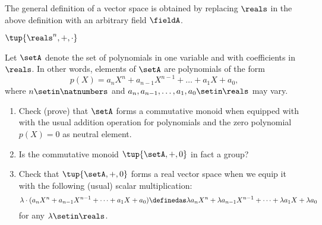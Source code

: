 \begin{remark}
    The general definition of a vector space is obtained by replacing $\reals$ in the above definition with an arbitrary field $\fieldA$.
\end{remark}

\begin{example}
    $\tup{\reals^n, +, \cdot}$
\end{example}



\begin{gradedexercise}
    \label{ex:real-polynomials}
    Let $\setA$ denote the set of polynomials in one variable and with coefficients in $\reals$.
    In other words, elements of $\setA$ are polynomials of the form
    \begin{equation}
        p(X) = a_nX^n + a_{n-1}X^{n-1} + \dots + a_1X + a_0,
    \end{equation}
    where $n \setin \natnumbers$ and $a_n, a_{n-1}, \dots, a_1, a_0 \setin \reals$ may vary.

    \begin{enumerate}
        \item Check (prove) that $\setA$ forms a commutative monoid when equipped with with the usual addition operation for polynomials and the zero polynomial $p(X) = 0$ as neutral element.
        \item Is the commutative monoid $\tup{\setA, +, 0}$ in fact a group?
        \item Check that $\tup{\setA, +, 0}$ forms a real vector space when we equip it with the following (usual) scalar multiplication:
              \begin{equation}
                  \lambda \cdot (a_nX^n + a_{n-1}
                  X^{n-1} + \dots + a_1X + a_0) \definedas \lambda a_nX^n + \lambda a_{n-1}X^{n-1} + \dots + \lambda a_1X + \lambda a_0
              \end{equation}
              for any $\lambda \setin \reals$.
    \end{enumerate}
\end{gradedexercise}


